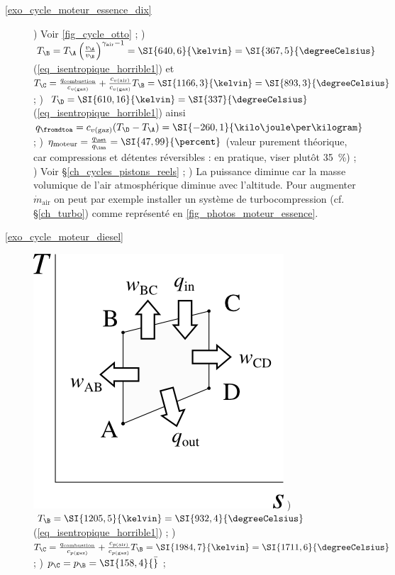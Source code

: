 	\begin{description}
		\item [\ref{exo_cycle_moteur_essence_dix}]
			) Voir \cref{fig_cycle_otto} ;
	 		) $T_\B = T_\A \left(\frac{v_\A}{v_\B}\right)^{\gamma_\text{air} - 1} = \SI{640,6}{\kelvin} = \SI{367,5}{\degreeCelsius}$ (\ref{eq_isentropique_horrible1}) et $T_\C = \frac{q_\text{combustion}}{c_{v \text{(gaz)}}} + \frac{c_{v \text{(air)}}}{c_{v \text{(gaz)}}} T_\B = \SI{1166,3}{\kelvin} = \SI{893,3}{\degreeCelsius}$ ;
	 		) $T_\D = \SI{610,16}{\kelvin} = \SI{337}{\degreeCelsius}$ (\ref{eq_isentropique_horrible1}) ainsi $q_\fromdtoa = c_{v \text{(gaz)}} (T_\D - T_\A) = \SI{-260,1}{\kilo\joule\per\kilogram}$ ;
	 		) $\eta_\text{moteur} = \frac{q_\net}{q_\inn} = \SI{47,99}{\percent}$ (valeur purement théorique, car compressions et détentes réversibles : en pratique, viser plutôt \SI{35}{\percent}) ;
	 		) Voir \S\ref{ch_cycles_pistons_reels} ;
	 		) La puissance diminue car la masse volumique de l’air atmosphérique diminue avec l’altitude. Pour augmenter $\dot m_\text{air}$ on peut par exemple installer un système de turbocompression (cf. \S\ref{ch_turbo}) comme représenté en \cref{fig_photos_moteur_essence}.
	 	\item [\ref{exo_cycle_moteur_diesel}]
	 		\includegraphics[width=\solutiondiagramwidth]{images/exo_sol_ts_diesel.png}
	 		) $T_\B = \SI{1205,5}{\kelvin} = \SI{932,4}{\degreeCelsius}$ (\ref{eq_isentropique_horrible1}) ;
	 		) $T_\C = \frac{q_\text{combustion}}{c_{p \text{(gaz)}}} + \frac{c_{p \text{(air)}}}{c_{p \text{(gaz)}}} T_\B = \SI{1984,7}{\kelvin} = \SI{1711,6}{\degreeCelsius}$ ;
	 		) $p_\C = p_\B = \SI{158,4}{\bar}$ ;

\end{description}
